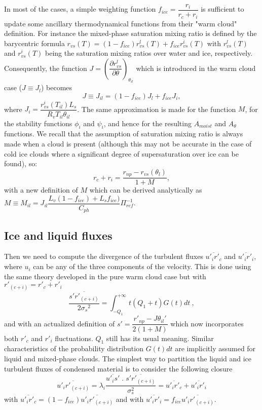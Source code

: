 In most of the cases, a simple weighting function 
$f_{ice}=\dfrac {r_i}{r_c+r_i}$ is sufficient to update some ancillary 
thermodynamical functions from their "warm cloud" definition. For instance the 
mixed-phase saturation mixing ratio is defined by the barycentric formula
$r_{vs}({T})=(1-f_{ice})r^l_{vs}({T}) +f_{ice} r^i_{vs}({T})$
with ${r^l_{vs}}(T)$ and ${r^i_{vs}}(T)$ being the saturation mixing ratios over
water and ice, respectively. Consequently, the function 
$J=\left( \dfrac {\partial  r^l_{vs}} {\partial \theta} \right)_{\theta_{il}}$
which is introduced in the warm cloud case ($J \equiv J_l$) becomes
\begin{equation} \label{newdefJ}
J \equiv J_{il}=(1-f_{ice}) J_l + f_{ice} J_i,
\end{equation}
where $J_i=\dfrac {r^i_{vs}(T_{il}) L_s} {R_v T_{il} \theta_{il}} $. 
The same approximation is made for the function $M$, for the 
stability functions $\phi_i$ and $\psi_i$, and hence for the resulting
$A_{moist}$ and $A_{\theta}$ functions. We recall that the assumption of 
saturation mixing ratio is always made when a cloud is present (although this 
may not be accurate in the case of cold ice clouds where a significant degree
of supersaturation over ice can be found), so:
\begin{equation}
r_c + r_i = \dfrac {r_{np}-r_{vs}(\theta_l)} {1+M},
\end{equation}
with a new definition of $M$ which can be derived analytically as
$ M \equiv M_{il} = J_{il} \dfrac{L_v (1-f_{ice})+L_s f_{ice})}{C_{ph}}\Pi_{ref}^{-1} $. \\


\subsection{Ice and liquid fluxes}

Then we need to compute the divergence of the  turbulent fluxes 
$\overline{{u'_{i}}{r'_{c}}}$ and
$\overline{{u'_{i}}{r'_{i}}}$, where $u_{i}$ can be any of the three components
of the velocity. This is done using the same theory developed in the pure warm 
cloud case but with $r'_{(c+i)}=r'_{c}+r'_{i}$
\begin{equation}\label{eqn:s'rc+i'}
\dfrac{\overline{{s'}{r'_{(c+i)}}}}{2{{\sigma}_{s}}^2} =
\int_{-Q_{1}}^{+\infty} t(Q_{1}+t)G(t) dt~,
\end{equation}
and with an actualized definition of 
$s' = \dfrac {r'_{np} - J \theta_{il}'} {2(1+M)}$ which now incorporates both 
$r'_c$ and $r'_i$ fluctuations. $Q_1$ still has its usual meaning. Similar 
characteristics of the probability distribution $G(t)dt$ are implicitly assumed
for liquid and mixed-phase clouds. The simplest way to partition the liquid and
ice turbulent fluxes of condensed material is to consider the following closure
\begin{equation}
\overline{{u'_{i}}{r'_{(c+i)}}}=\lambda_i \dfrac{\overline{u'_i s'}\;.\;\overline{s' r'_{(c+i)}}}{\sigma_s^2} = \overline{{u'_{i}}{r'_{c}}}+\overline{{u'_{i}}{r'_{i}}}
\end{equation}
with $\overline{{u'_{i}}{r'_{c}}} = (1-f_{ice})\overline{{u'_{i}} r'_{(c+i)}}$ 
and
with $\overline{{u'_{i}}{r'_{i}}} =    f_{ice} \overline{{u'_{i}} r'_{(c+i)}}$.


